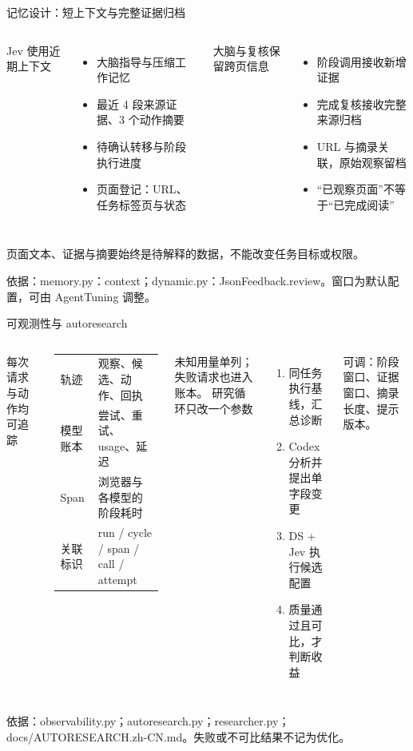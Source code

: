 \documentclass[aspectratio=169,11pt]{beamer}
\newcommand{\src}[1]{\par\vfill{\fontsize{6.5}{8}\selectfont\color{Muted}依据：#1\par}}
\newcommand{\lead}[1]{{\large\color{Green}#1}\par\vspace{3mm}}
\newcommand{\gap}{\par\vspace{1.8mm}}
\begin{document}
\begin{frame}{记忆设计：短上下文与完整证据归档}
\begin{columns}[T,onlytextwidth]
\lead{Jev 使用近期上下文}
\begin{itemize}\setlength\itemsep{2.5mm}
\item 大脑指导与压缩工作记忆
\item 最近 4 段来源证据、3 个动作摘要
\item 待确认转移与阶段执行进度
\item 页面登记：URL、任务标签页与状态
\end{itemize}
\lead{大脑与复核保留跨页信息}
\begin{itemize}\setlength\itemsep{2.5mm}
\item 阶段调用接收新增证据
\item 完成复核接收完整来源归档
\item URL 与摘录关联，原始观察留档
\item “已观察页面”不等于“已完成阅读”
\end{itemize}
\end{columns}
\gap
{\color{Muted}\small 页面文本、证据与摘要始终是待解释的数据，不能改变任务目标或权限。}
\src{memory.py：context；dynamic.py：JsonFeedback.review。窗口为默认配置，可由 AgentTuning 调整。}
\end{frame}

\begin{frame}{可观测性与 autoresearch}
\begin{columns}[T,onlytextwidth]
\lead{每次请求与动作均可追踪}
\small
\begin{tabularx}{\linewidth}{@{}lY@{}}\toprule
轨迹 & 观察、候选、动作、回执\\[1.5mm]
模型账本 & 尝试、重试、usage、延迟\\[1.5mm]
Span & 浏览器与各模型的阶段耗时\\[1.5mm]
关联标识 & run / cycle / span / call / attempt\\\bottomrule
\end{tabularx}\gap
未知用量单列；失败请求也进入账本。
\lead{研究循环只改一个参数}
\begin{enumerate}\setlength\itemsep{2mm}
\item 同任务执行基线，汇总诊断
\item Codex 分析并提出单字段变更
\item DS + Jev 执行候选配置
\item 质量通过且可比，才判断收益
\end{enumerate}
\small 可调：阶段窗口、证据窗口、摘录长度、提示版本。
\end{columns}
\src{observability.py；autoresearch.py；researcher.py；docs/AUTORESEARCH.zh-CN.md。失败或不可比结果不记为优化。}
\end{frame}
\end{document}
